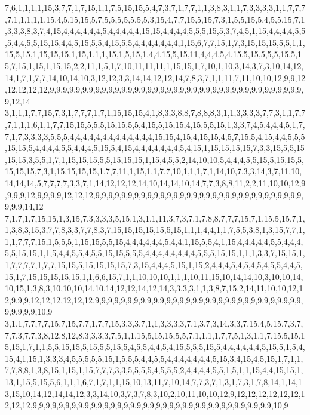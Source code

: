 7,6,1,1,1,1,15,3,7,7,1,7,15,1,1,7,5,15,15,5,4,7,3,7,1,7,7,1,1,3,8,3,1,1,7,3,3,3,3,1,1,7,7,7,7,1,1,1,1,1,15,4,5,15,15,5,7,5,5,5,5,5,5,5,3,15,4,7,7,15,5,15,7,3,1,5,5,15,5,4,5,5,15,7,1,3,3,3,8,3,7,4,15,4,4,4,4,4,4,5,4,4,4,4,4,15,15,4,4,4,4,5,5,5,15,5,3,7,4,5,1,15,4,4,4,4,5,5,5,4,4,5,5,15,15,4,4,5,15,5,5,4,15,5,5,4,4,4,4,4,4,4,1,15,6,7,7,15,1,7,3,15,15,15,5,5,1,1,15,5,15,1,15,15,15,1,15,1,1,1,15,1,5,15,1,4,4,15,5,15,11,4,4,4,5,4,15,5,15,5,5,5,15,5,15,7,15,1,15,1,15,15,2,2,11,1,5,1,7,10,11,11,11,1,15,15,1,7,10,1,10,3,14,3,7,3,10,14,12,14,1,7,1,7,7,14,10,14,10,3,12,12,3,3,14,14,12,12,14,7,8,3,7,1,1,11,7,11,10,10,12,9,9,12,12,12,12,12,9,9,9,9,9,9,9,9,9,9,9,9,9,9,9,9,9,9,9,9,9,9,9,9,9,9,9,9,9,9,9,9,9,9,9,9,9,9,9,9,12,14
3,1,1,1,7,7,15,7,3,1,7,7,7,1,7,1,15,15,15,4,1,8,3,3,8,8,7,8,8,8,3,1,1,3,3,3,3,7,7,3,1,1,7,7,7,1,1,1,6,1,1,7,7,15,15,5,5,5,15,15,5,5,4,15,5,15,15,4,15,5,5,15,1,3,3,7,4,5,4,4,4,5,1,7,7,1,7,3,3,3,3,5,5,5,4,4,4,4,4,4,4,4,4,4,4,4,4,15,15,4,15,4,15,15,4,5,7,15,5,4,15,4,4,5,5,5,15,15,5,4,4,4,4,5,5,4,4,4,5,15,5,4,15,4,4,4,4,4,4,4,5,4,15,1,15,15,15,15,7,3,3,15,5,5,15,15,15,3,5,5,1,7,1,15,15,15,5,5,15,15,15,1,15,4,5,5,2,14,10,10,5,4,4,4,5,5,15,5,15,15,5,15,15,15,7,3,1,15,15,15,15,1,7,7,11,1,15,1,1,7,7,10,1,1,1,7,1,14,10,7,3,3,14,3,7,11,10,14,14,14,5,7,7,7,7,3,3,7,1,14,12,12,12,14,10,14,14,10,14,7,7,3,8,8,11,2,2,11,10,10,12,9,9,9,9,12,9,9,9,9,12,12,12,9,9,9,9,9,9,9,9,9,9,9,9,9,9,9,9,9,9,9,9,9,9,9,9,9,9,9,9,9,9,9,9,9,9,9,14,12
7,1,7,1,7,15,15,1,3,15,7,3,3,3,3,5,15,1,3,1,1,11,3,7,3,7,1,7,8,8,7,7,7,15,7,1,15,5,15,7,1,1,3,8,3,15,3,7,7,8,3,3,7,7,8,3,7,15,15,15,15,15,5,15,1,1,1,4,4,1,1,7,5,5,3,8,1,3,15,7,7,1,1,1,7,7,7,15,1,5,5,5,1,15,15,5,5,15,4,4,4,4,4,4,5,4,4,1,15,5,5,4,1,15,4,4,4,4,4,5,5,4,4,4,5,5,15,15,1,1,5,4,4,5,5,4,5,5,15,15,5,5,5,4,4,4,4,4,4,4,4,5,5,5,15,15,1,1,1,3,3,7,15,15,1,1,7,7,7,7,1,7,7,15,15,5,15,15,15,15,7,3,15,4,4,4,5,15,1,15,2,4,4,4,5,4,5,4,5,4,5,5,4,4,5,15,1,7,15,15,15,15,15,1,1,6,6,15,7,1,1,10,10,10,1,1,1,10,11,15,10,14,14,10,3,10,10,14,10,15,1,3,8,3,10,10,10,14,10,14,12,12,14,12,14,3,3,3,3,1,1,3,8,7,15,2,14,11,10,10,12,12,9,9,9,12,12,12,12,12,12,9,9,9,9,9,9,9,9,9,9,9,9,9,9,9,9,9,9,9,9,9,9,9,9,9,9,9,9,9,9,9,9,9,9,9,9,9,10,9
3,1,1,7,7,7,7,15,7,15,7,7,1,7,7,15,3,3,3,7,1,1,3,3,3,3,7,1,3,7,3,14,3,3,7,15,4,5,15,7,3,7,7,7,3,7,7,3,8,12,8,12,8,3,3,3,3,7,5,1,1,15,5,15,15,5,5,7,1,1,1,1,7,7,5,1,3,1,1,7,15,5,15,15,15,1,7,1,1,5,5,15,15,5,15,5,5,15,5,4,5,5,4,4,5,4,15,5,5,5,15,5,4,4,4,4,4,4,5,15,5,1,5,4,15,4,1,15,1,3,3,3,4,5,5,5,5,5,15,1,5,5,5,4,4,5,5,4,4,4,4,4,4,4,5,15,3,4,15,4,5,15,1,7,1,1,7,7,8,8,1,3,8,15,1,15,1,15,7,7,7,3,3,5,5,5,5,4,5,5,5,2,4,4,4,4,5,5,1,5,1,1,15,4,4,15,15,1,13,1,15,5,15,5,6,1,1,1,6,7,1,7,1,1,15,10,13,11,7,10,14,7,7,3,7,1,3,1,7,3,1,7,8,14,1,14,13,15,10,14,12,14,14,12,3,3,14,10,3,7,3,7,8,3,10,2,10,11,10,10,12,9,12,12,12,12,12,12,12,12,12,9,9,9,9,9,9,9,9,9,9,9,9,9,9,9,9,9,9,9,9,9,9,9,9,9,9,9,9,9,9,9,9,9,9,9,9,9,10,9
